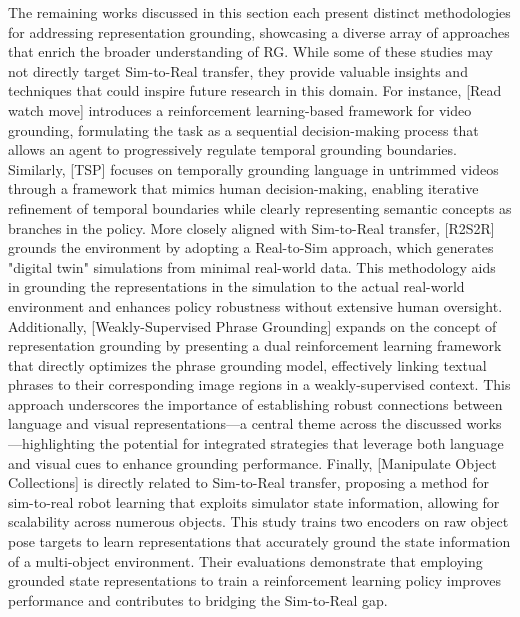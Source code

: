 The remaining works discussed in this section each present distinct methodologies for addressing representation grounding, showcasing a diverse array of approaches that enrich the broader understanding of RG. While some of these studies may not directly target Sim-to-Real transfer, they provide valuable insights and techniques that could inspire future research in this domain. For instance, [Read watch move] introduces a reinforcement learning-based framework for video grounding, formulating the task as a sequential decision-making process that allows an agent to progressively regulate temporal grounding boundaries. Similarly, [TSP] focuses on temporally grounding language in untrimmed videos through a framework that mimics human decision-making, enabling iterative refinement of temporal boundaries while clearly representing semantic concepts as branches in the policy. More closely aligned with Sim-to-Real transfer, [R2S2R] grounds the environment by adopting a Real-to-Sim approach, which generates "digital twin" simulations from minimal real-world data. This methodology aids in grounding the representations in the simulation to the actual real-world environment and enhances policy robustness without extensive human oversight. Additionally, [Weakly-Supervised Phrase Grounding] expands on the concept of representation grounding by presenting a dual reinforcement learning framework that directly optimizes the phrase grounding model, effectively linking textual phrases to their corresponding image regions in a weakly-supervised context. This approach underscores the importance of establishing robust connections between language and visual representations—a central theme across the discussed works—highlighting the potential for integrated strategies that leverage both language and visual cues to enhance grounding performance. Finally, [Manipulate Object Collections] is directly related to Sim-to-Real transfer, proposing a method for sim-to-real robot learning that exploits simulator state information, allowing for scalability across numerous objects. This study trains two encoders on raw object pose targets to learn representations that accurately ground the state information of a multi-object environment. Their evaluations demonstrate that employing grounded state representations to train a reinforcement learning policy improves performance and contributes to bridging the Sim-to-Real gap.
